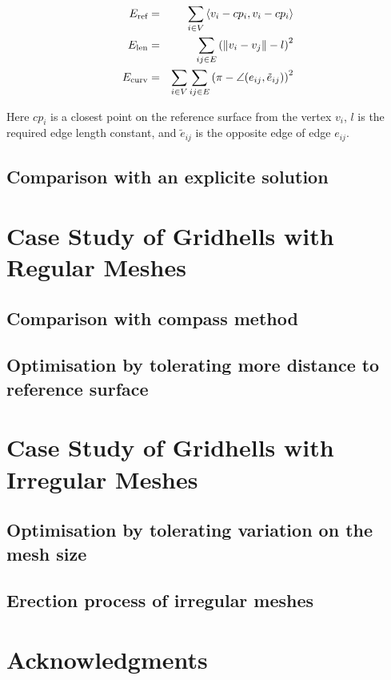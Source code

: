 \documentclass[twoside]{article}
\begin{document}
\begin{eqnarray}
E_{\textrm{\scriptsize{ref}}} &=& \sum_{i\in V}  \left<v_i-cp_i,v_i-cp_i\right>\\
E_{\textrm{\scriptsize{len}}} &=& \sum_{ij\in E} \left(\Vert v_i-v_j \Vert - l \right)^2\\
E_{\textrm{\scriptsize{curv}}} &=& \sum_{i\in V} \sum_{ij\in E} \left(\pi - \angle(e_{ij}, \tilde e_{ij}) \right)^2
\end{eqnarray}

Here $cp_i$ is a closest point on the reference surface from the vertex $v_i$, $l$ is the required edge length constant, and $\tilde e_{ij}$ is the opposite edge of edge $e_{ij}$.

\subsection{Comparison with an explicite solution}



\section{Case Study of Gridhells with Regular Meshes}

\subsection{Comparison with compass method}

\subsection{Optimisation by tolerating more distance to reference surface}

\section{Case Study of Gridhells with Irregular Meshes}

\subsection{Optimisation by tolerating variation on the mesh size}

\subsection{Erection process of irregular meshes}

\section*{Acknowledgments}
\end{document}
